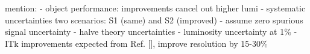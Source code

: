 mention:
- object performance: improvements cancel out higher lumi
- systematic uncertainties two scenarios: S1 (same) and S2 (improved)
    - assume zero spurious signal uncertainty
    - halve theory uncertainties
    - luminosity uncertainty at 1\%
- ITk improvements expected from Ref. [], improve resolution by 15-30\%


